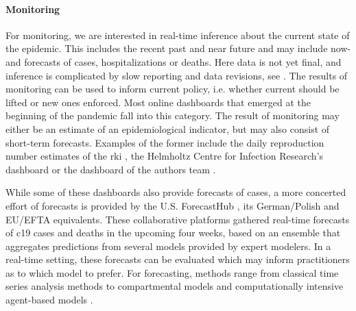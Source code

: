 \paragraph{Monitoring}
For monitoring, we are interested in real-time inference about the current state of the epidemic. This includes the recent past and near future and may include now- and forecasts of cases, hospitalizations or deaths. Here data is not yet final, and inference is complicated by slow reporting and data revisions, see . The results of monitoring can be used to inform current policy, i.e. whether current  should be lifted or new ones enforced. Most online dashboards that emerged at the beginning of the pandemic fall into this category. The result of monitoring may either be an estimate of an epidemiological indicator, but may also consist of short-term forecasts. Examples of the former include the daily reproduction number estimates of the \acrshort{rki} \cite{AnDerHeiden2020Schatzung}, the Helmholtz Centre for Infection Research's dashboard \cite{Khailaie2021Development} or the dashboard of the authors team \cite{Hotz2020Monitoring}.

While some of these dashboards also provide forecasts of cases, a more concerted effort of forecasts is provided by the U.S. ForecastHub \cite{Ray2020Ensemble}, its German/Polish \cite{Bracher2021Preregistered,Bracher2022National} and EU/EFTA \cite{Sherratt2022Predictive} equivalents. These collaborative platforms gathered real-time forecasts of \acrshort{c19} cases and deaths in the upcoming four weeks, based on an ensemble that aggregates predictions from several models provided by expert modelers. In a real-time setting, these forecasts can be evaluated which may inform practitioners as to which model to prefer. 
For forecasting, methods range from classical time series analysis methods \cite{Arroyo-Marioli2021Tracking} to compartmental models \cite{Khailaie2021Development} and computationally intensive agent-based models \cite{Adamik2020Mitigation}.

